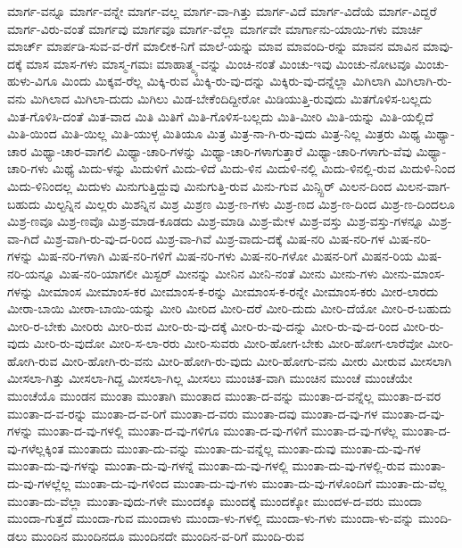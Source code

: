 {ಮಾರ್ಗ-ವನ್ನೂ
ಮಾರ್ಗ-ವನ್ನೇ
ಮಾರ್ಗ-ವಲ್ಲ
ಮಾರ್ಗ-ವಾ-ಗಿತ್ತು
ಮಾರ್ಗ-ವಿದೆ
ಮಾರ್ಗ-ವಿದೆಯೆ
ಮಾರ್ಗ-ವಿದ್ದರೆ
ಮಾರ್ಗ-ವಿರು-ವಂತೆ
ಮಾರ್ಗವು
ಮಾರ್ಗವೂ
ಮಾರ್ಗ-ವೆಲ್ಲಾ
ಮಾರ್ಗವೇ
ಮಾರ್ಗಾನು-ಯಾಯಿ-ಗಳು
ಮಾರ್ಚಿ
ಮಾರ್ಚ್
ಮಾರ್ಪಡಿ-ಸುವ-ವ-ರೆಗೆ
ಮಾಲೀಕ-ನಿಗೆ
ಮಾಲೆ-ಯನ್ನು
ಮಾವ
ಮಾವಂದಿ-ರನ್ನು
ಮಾವನ
ಮಾವಿನ
ಮಾವು-ದಕ್ಕೆ
ಮಾಸ
ಮಾಸ-ಗಳು
ಮಾಸ್ಮ-ಗಮಃ
ಮಾಹಾತ್ಮ್ಯ-ವನ್ನು
ಮಿಂಚಿ-ನಂತೆ
ಮಿಂಚು-ಇವು
ಮಿಂಚು-ನೋಟವೂ
ಮಿಂಚು-ಹುಳು-ವಿಗೂ
ಮಿಂದು
ಮಿಕ್ಕವ-ರೆಲ್ಲ
ಮಿಕ್ಕಿ-ರುವ
ಮಿಕ್ಕಿ-ರು-ವು-ದನ್ನು
ಮಿಕ್ಕಿರು-ವು-ದನ್ನೆಲ್ಲಾ
ಮಿಗಿಲಾಗಿ
ಮಿಗಿಲಾಗಿ-ರು-ವನು
ಮಿಗಿಲಾದ
ಮಿಗಿಲಾ-ದುದು
ಮಿಗಿಲು
ಮಿಡ-ಬೇಕೆಂದಿದ್ದೀರೋ
ಮಿಡಿಯುತ್ತಿ-ರುವುದು
ಮಿತಗೊಳಿಸ-ಬಲ್ಲದು
ಮಿತ-ಗೊಳಿಸಿ-ದಂತೆ
ಮಿತ-ವಾದ
ಮಿತಿ
ಮಿತಿಗೆ
ಮಿತಿ-ಗೊಳಿಸ-ಬಲ್ಲದು
ಮಿತಿ-ಮೀರಿ
ಮಿತಿ-ಯನ್ನು
ಮಿತಿ-ಯಲ್ಲಿದೆ
ಮಿತಿ-ಯಿಂದ
ಮಿತಿ-ಯಿಲ್ಲ
ಮಿತಿ-ಯುಳ್ಳ
ಮಿತಿಯೂ
ಮಿತ್ರ
ಮಿತ್ರ-ನಾ-ಗಿ-ರು-ವುದು
ಮಿತ್ರ-ನಿಲ್ಲ
ಮಿತ್ರರು
ಮಿಥ್ಯ
ಮಿಥ್ಯಾ-ಚಾರ
ಮಿಥ್ಯಾ-ಚಾರ-ವಾಗಲಿ
ಮಿಥ್ಯಾ-ಚಾರಿ-ಗಳನ್ನು
ಮಿಥ್ಯಾ-ಚಾರಿ-ಗಳಾಗುತ್ತಾರೆ
ಮಿಥ್ಯಾ-ಚಾರಿ-ಗಳಾಗು-ವೆವು
ಮಿಥ್ಯಾ-ಚಾರಿ-ಗಳು
ಮಿಥ್ಯೆ
ಮಿದು-ಳನ್ನು
ಮಿದುಳಿಗೆ
ಮಿದು-ಳಿದೆ
ಮಿದು-ಳಿನ
ಮಿದುಳಿ-ನಲ್ಲಿ
ಮಿದು-ಳಿನಲ್ಲಿ-ರುವ
ಮಿದುಳಿ-ನಿಂದ
ಮಿದು-ಳಿನಿಂದಲ್ಲ
ಮಿದುಳು
ಮಿನುಗುತ್ತಿದ್ದುವು
ಮಿನುಗುತ್ತಿ-ರುವ
ಮಿನು-ಗುವ
ಮಿನ್ಸ್ಟಿರ್
ಮಿಲನ-ದಿಂದ
ಮಿಲನ-ವಾಗ-ಬಹುದು
ಮಿಲ್ಟನ್ನಿನ
ಮಿಲ್ಲರು
ಮಿಶನ್ನಿನ
ಮಿಶ್ರ
ಮಿಶ್ರಣ
ಮಿಶ್ರ-ಣ-ಗಳು
ಮಿಶ್ರ-ಣದ
ಮಿಶ್ರ-ಣ-ದಿಂದ
ಮಿಶ್ರ-ಣ-ದಿಂದಲೂ
ಮಿಶ್ರ-ಣವೂ
ಮಿಶ್ರ-ಣವೊ
ಮಿಶ್ರ-ಮಾಡ-ಕೂಡದು
ಮಿಶ್ರ-ಮಾಡಿ
ಮಿಶ್ರ-ಮೇಳ
ಮಿಶ್ರ-ವಸ್ತು
ಮಿಶ್ರ-ವಸ್ತು-ಗಳನ್ನೂ
ಮಿಶ್ರ-ವಾ-ಗಿದೆ
ಮಿಶ್ರ-ವಾಗಿ-ರು-ವು-ದ-ರಿಂದ
ಮಿಶ್ರ-ವಾ-ಗಿವೆ
ಮಿಶ್ರ-ವಾದು-ದಕ್ಕೆ
ಮಿಷ-ನರಿ
ಮಿಷ-ನರಿ-ಗಳ
ಮಿಷ-ನರಿ-ಗಳನ್ನು
ಮಿಷ-ನರಿ-ಗಳಾಗಿ
ಮಿಷ-ನರಿ-ಗಳಿಗೆ
ಮಿಷ-ನರಿ-ಗಳು
ಮಿಷ-ನರಿ-ಗಳೋ
ಮಿಷನ-ರಿಗೆ
ಮಿಷನ-ರಿಯ
ಮಿಷ-ನರಿ-ಯನ್ನೂ
ಮಿಷ-ನರಿ-ಯಾಗಲೀ
ಮಿಸ್ಟರ್
ಮೀನನ್ನು
ಮೀನಿನ
ಮೀನಿ-ನಂತೆ
ಮೀನು
ಮೀನು-ಗಳು
ಮೀನು-ಮಾಂಸ-ಗಳನ್ನು
ಮೀಮಾಂಸ
ಮೀಮಾಂಸ-ಕರ
ಮೀಮಾಂಸ-ಕ-ರನ್ನು
ಮೀಮಾಂಸ-ಕ-ರನ್ನೇ
ಮೀಮಾಂಸ-ಕರು
ಮೀರ-ಲಾರದು
ಮೀರಾ-ಬಾಯಿ
ಮೀರಾ-ಬಾಯಿ-ಯನ್ನು
ಮೀರಿ
ಮೀರಿದ
ಮೀರಿ-ದರೆ
ಮೀರಿ-ದುದು
ಮೀರಿ-ದೆಯೋ
ಮೀರಿ-ರ-ಬಹುದು
ಮೀರಿ-ರ-ಬೇಕು
ಮೀರಿರು
ಮೀರಿ-ರುವ
ಮೀರಿ-ರು-ವು-ದಕ್ಕೆ
ಮೀರಿ-ರು-ವು-ದನ್ನು
ಮೀರಿ-ರು-ವು-ದ-ರಿಂದ
ಮೀರಿ-ರು-ವುದು
ಮೀರಿ-ರು-ವುದೋ
ಮೀರಿ-ಸ-ಲಾ-ರರು
ಮೀರಿ-ಸುವರು
ಮೀರಿ-ಹೋಗ-ಬೇಕು
ಮೀರಿ-ಹೋಗ-ಲಾರೆವೋ
ಮೀರಿ-ಹೋಗಿ-ರುವ
ಮೀರಿ-ಹೋಗಿ-ರು-ವನು
ಮೀರಿ-ಹೋಗಿ-ರು-ವುದು
ಮೀರಿ-ಹೋಗು-ವನು
ಮೀರು
ಮೀರುವ
ಮೀಸಲಾಗಿ
ಮೀಸಲಾ-ಗಿತ್ತು
ಮೀಸಲಾ-ಗಿದ್ದ
ಮೀಸಲಾ-ಗಿಲ್ಲ
ಮೀಸಲು
ಮುಂಚಿತ-ವಾಗಿ
ಮುಂಚಿನ
ಮುಂಚೆ
ಮುಂಚೆಯೇ
ಮುಂಚೆಯೊ
ಮುಂಡನ
ಮುಂತಾ
ಮುಂತಾಗಿ
ಮುಂತಾದ
ಮುಂತಾ-ದ-ವನ್ನು
ಮುಂತಾ-ದ-ವನ್ನೆಲ್ಲ
ಮುಂತಾ-ದ-ವರ
ಮುಂತಾ-ದ-ವ-ರನ್ನು
ಮುಂತಾ-ದ-ವ-ರಿಗೆ
ಮುಂತಾ-ದ-ವರು
ಮುಂತಾ-ದವು
ಮುಂತಾ-ದ-ವು-ಗಳ
ಮುಂತಾ-ದ-ವು-ಗಳನ್ನು
ಮುಂತಾ-ದ-ವು-ಗಳಲ್ಲಿ
ಮುಂತಾ-ದ-ವು-ಗಳಿಗೂ
ಮುಂತಾ-ದ-ವು-ಗಳಿಗೆ
ಮುಂತಾ-ದ-ವು-ಗಳೆಲ್ಲ
ಮುಂತಾ-ದ-ವು-ಗಳೆಲ್ಲಕ್ಕಿಂತ
ಮುಂತಾದು
ಮುಂತಾ-ದು-ವನ್ನು
ಮುಂತಾ-ದು-ವನ್ನೆಲ್ಲ
ಮುಂತಾ-ದುವು
ಮುಂತಾ-ದು-ವು-ಗಳ
ಮುಂತಾ-ದು-ವು-ಗಳನ್ನು
ಮುಂತಾ-ದು-ವು-ಗಳನ್ನೆ
ಮುಂತಾ-ದು-ವು-ಗಳಲ್ಲಿ
ಮುಂತಾ-ದು-ವು-ಗಳಲ್ಲಿ-ರುವ
ಮುಂತಾ-ದು-ವು-ಗಳಲ್ಲೆಲ್ಲ
ಮುಂತಾ-ದು-ವು-ಗಳಿಂದ
ಮುಂತಾ-ದು-ವು-ಗಳು
ಮುಂತಾ-ದು-ವು-ಗಳೊಂದಿಗೆ
ಮುಂತಾ-ದು-ವೆಲ್ಲ
ಮುಂತಾ-ದು-ವೆಲ್ಲಾ
ಮುಂತಾ-ವುದು-ಗಳೇ
ಮುಂದಕ್ಕೂ
ಮುಂದಕ್ಕೆ
ಮುಂದಕ್ಕೋ
ಮುಂದಳ-ದ-ವರು
ಮುಂದಾ
ಮುಂದಾ-ಗುತ್ತದೆ
ಮುಂದಾ-ಗುವ
ಮುಂದಾಳು
ಮುಂದಾ-ಳು-ಗಳಲ್ಲಿ
ಮುಂದಾ-ಳು-ಗಳು
ಮುಂದಾ-ಳು-ವನ್ನು
ಮುಂದಿ-ಡಲು
ಮುಂದಿನ
ಮುಂದಿನದೂ
ಮುಂದಿನದೇ
ಮುಂದಿನ-ವ-ರಿಗೆ
ಮುಂದಿ-ರುವ
}
